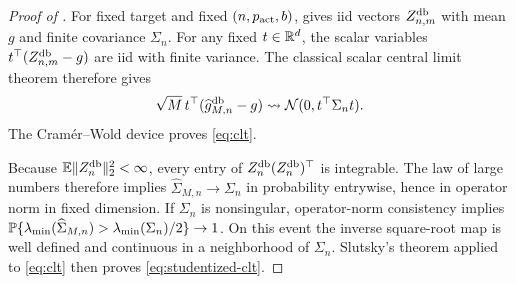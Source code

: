 \begin{proof}[Proof of ]
For fixed target and fixed $(n,p_{\rm act},b)$,  gives iid vectors $Z_{n,m}^{\mathrm{db}}$ with mean $g$ and finite covariance $\Sigma_n$.  For any fixed $t\in\mathbb R^d$, the scalar variables
$t^\top(Z_{n,m}^{\mathrm{db}}-g)$ are iid with finite variance.  The classical scalar central limit theorem therefore gives
\[
 \sqrt M\,t^\top(\widehat g_{M,n}^{\mathrm{db}}-g)
 \rightsquigarrow \mathcal N(0,t^\top\Sigma_nt).
\]
The Cram\'er--Wold device proves \eqref{eq:clt}.

Because $\mathbb E\lVert Z_n^{\mathrm{db}}\rVert_2^2<\infty$, every entry of $Z_n^{\mathrm{db}}(Z_n^{\mathrm{db}})^\top$ is integrable.  The law of large numbers therefore implies
$\widehat\Sigma_{M,n}\to\Sigma_n$ in probability entrywise, hence in operator norm in fixed dimension.  If $\Sigma_n$ is nonsingular, operator-norm consistency implies
$\mathbb P\{\lambda_{\min}(\widehat\Sigma_{M,n})>\lambda_{\min}(\Sigma_n)/2\}\to1$.
On this event the inverse square-root map is well defined and continuous in a neighborhood of $\Sigma_n$.  Slutsky's theorem applied to \eqref{eq:clt} then proves \eqref{eq:studentized-clt}.
\end{proof}
